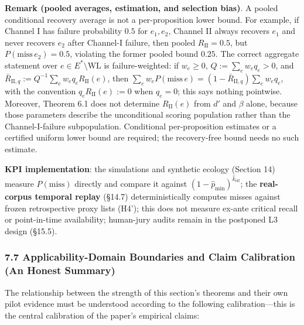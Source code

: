 \documentclass[
  11pt]{article}
\begin{document}
\textbf{Remark (pooled averages, estimation, and selection bias)}. A
pooled conditional recovery average is not a per-proposition lower
bound. For example, if Channel I has failure probability \(0.5\) for
\(e_1,e_2\), Channel II always recovers \(e_1\) and never recovers
\(e_2\) after Channel-I failure, then pooled \(R_{\mathrm{II}}=0.5\),
but \(P(\mathrm{miss}\,e_2)=0.5\), violating the former pooled bound
\(0.25\). The correct aggregate statement over
\(e\in E^*\setminus\mathrm{WL}\) is failure-weighted: if \(w_e\ge0\),
\(Q:=\sum_ew_eq_e>0\), and
\(\bar R_{\mathrm{II},q}:=Q^{-1}\sum_ew_eq_eR_{\mathrm{II}}(e)\), then
\(\sum_ew_eP(\mathrm{miss}\,e)=(1-\bar R_{\mathrm{II},q})\sum_ew_eq_e\),
with the convention \(q_eR_{\mathrm{II}}(e):=0\) when \(q_e=0\); this
says nothing pointwise. Moreover, Theorem 6.1 does not determine
\(R_{\mathrm{II}}(e)\) from \(d'\) and \(\beta\) alone, because those
parameters describe the unconditional scoring population rather than the
Channel-I-failure subpopulation. Conditional per-proposition estimates
or a certified uniform lower bound are required; the recovery-free bound
needs no such estimate.

\textbf{KPI implementation}: the simulations and synthetic ecology
(Section 14) measure \(P(\mathrm{miss})\) directly and compare it
against \((1-\hat p_{\min})^{\hat k_{\mathrm{eff}}}\); the
\textbf{real-corpus temporal replay} (§14.7) deterministically computes
misses against frozen retrospective proxy lists (H4'); this does not
measure ex-ante critical recall or point-in-time availability;
human-jury audits remain in the postponed L3 design (§15.5).

\subsubsection{7.7 Applicability-Domain Boundaries and Claim Calibration
(An Honest
Summary)}\label{applicability-domain-boundaries-and-claim-calibration-an-honest-summary}

The relationship between the strength of this section's theorems and
their own pilot evidence must be understood according to the following
calibration---this is the central calibration of the paper's empirical
claims:
\end{document}

